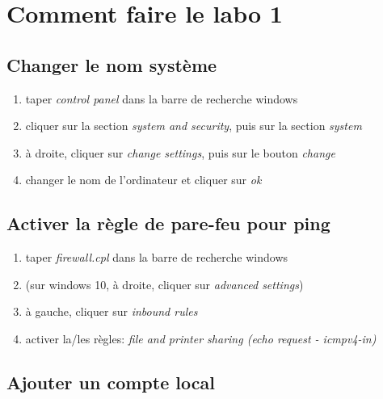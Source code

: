 \documentclass[a4paper]{article}
\begin{document}
\section{Comment faire le labo 1}





\subsection{Changer le nom système}



\begin{enumerate}
    \item  taper \textit{control panel} dans la barre de recherche windows
    \item cliquer sur la section \textit{system and security}, puis sur la section \textit{system}
    \item à droite, cliquer sur \textit{change settings}, puis sur le bouton \textit{change}
    \item changer le nom de l'ordinateur et cliquer sur \textit{ok}
\end{enumerate}





\subsection{Activer la règle de pare-feu pour ping}



\begin{enumerate}
    \item taper \textit{firewall.cpl} dans la barre de recherche windows
    \item (sur windows 10, à droite, cliquer sur \textit{advanced settings})
    \item à gauche, cliquer sur \textit{inbound rules}
    \item activer la/les règles: \textit{file and printer sharing (echo request - icmpv4-in)}
\end{enumerate}





\subsection{Ajouter un compte local}
\end{document}
